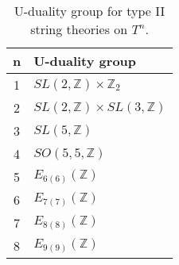 \begin{table}\centering
    \caption{U-duality group for type II string theories on $T^n$.}\label{tab:UdualityString}
    \begin{tabular}{|c|l|}\hline
        n & U-duality group \\\hline
        1 & $SL(2,\mathbb{Z})\times\mathbb{Z}_2$\\
        2 & $SL(2,\mathbb{Z})\times SL(3,\mathbb{Z})$\\
        3 & $SL(5,\mathbb{Z})$\\
        4 & $SO(5,5,\mathbb{Z})$\\
        5 & $E_{6(6)}(\mathbb{Z})$\\
        6 & $E_{7(7)}(\mathbb{Z})$\\
        7 & $E_{8(8)}(\mathbb{Z})$\\
        8 & $E_{9(9)}(\mathbb{Z})$\\\hline
    \end{tabular}
\end{table}


